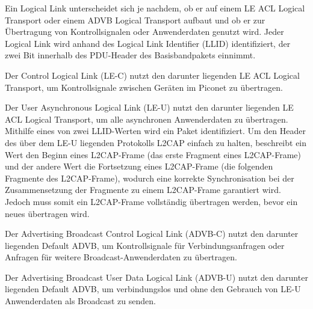 Ein Logical Link unterscheidet sich je nachdem, ob er auf einem LE ACL Logical Transport oder einem ADVB Logical Transport aufbaut und ob er zur Übertragung von Kontrollsignalen oder Anwenderdaten genutzt wird. Jeder Logical Link wird anhand des Logical Link Identifier (LLID) identifiziert, der zwei Bit innerhalb des PDU-Header des Basisbandpakets einnimmt.

Der Control Logical Link (LE-C) nutzt den darunter liegenden LE ACL Logical Transport, um Kontrollsignale zwischen Geräten im Piconet zu übertragen.

Der User Asynchronous Logical Link (LE-U) nutzt den darunter liegenden LE ACL Logical Transport, um alle asynchronen Anwenderdaten zu übertragen. Mithilfe eines von zwei LLID-Werten wird ein Paket identifiziert. Um den Header des über dem LE-U liegenden Protokolls L2CAP einfach zu halten, beschreibt ein Wert den Beginn eines L2CAP-Frame (das erste Fragment eines L2CAP-Frame) und der andere Wert die Fortsetzung eines L2CAP-Frame (die folgenden Fragmente des L2CAP-Frame), wodurch eine korrekte Synchronisation bei der Zusammensetzung der Fragmente zu einem L2CAP-Frame garantiert wird. Jedoch muss somit ein L2CAP-Frame vollständig übertragen werden, bevor ein neues übertragen wird.

Der Advertising Broadcast Control Logical Link (ADVB-C) nutzt den darunter liegenden Default ADVB, um Kontrollsignale für Verbindungsanfragen oder Anfragen für weitere Broadcast-Anwenderdaten zu übertragen.

Der Advertising Broadcast User Data Logical Link (ADVB-U) nutzt den darunter liegenden Default ADVB, um verbindungslos und ohne den Gebrauch von LE-U Anwenderdaten als Broadcast zu senden.
